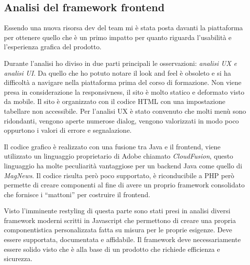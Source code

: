 \documentclass[a4paper]{article}
\begin{document}
\subsection{Analisi del framework frontend}
\par Essendo una nuova risorsa dev del team mi è stata posta davanti la piattaforma per
ottenere quello che è un primo impatto per quanto riguarda l'usabilità e l'esperienza
grafica del prodotto.
\par Durante l'analisi ho diviso in due parti principali le osservazioni: \emph{analisi UX e analisi UI}.
Da quello che ho potuto notare il look and feel è obsoleto e si ha difficoltà a navigare 
nella piattaforma prima del corso di formazione. Non viene presa in considerazione la responsivness,
il sito è molto statico e deformato visto da mobile. Il sito è organizzato con il codice
HTML con una impostazione tabellare non accessibile. Per l'analisi UX è stato convenuto 
che molti menù sono ridondanti, vengono aperte numerose dialog, vengono valorizzati in 
modo poco oppurtono i valori di errore e segnalazione.
\par Il codice grafico è realizzato con una fusione tra Java e il frontend, viene utilizzato
un linguaggio proprietario di Adobe chiamato \emph{CloudFusion}, questo linguaggio ha
molte peculiarità vantaggiose per un backend Java come quello di \emph{MagNews}.
Il codice risulta però poco supportato, è riconducibile a PHP però permette di creare
componenti al fine di avere un proprio framework consolidato che fornisce i ``mattoni''
per costruire il frontend.
\par Visto l'imminente restyling di questa parte sono stati presi in analisi diversi
framework moderni scritti in Javascript che permettono di creare una propria componentistica
personalizzata fatta su misura per le proprie esigenze. Deve essere supportata, 
documentata e affidabile. Il framework deve necessariamente essere solido visto che 
è alla base di un prodotto che richiede efficienza e sicurezza. \\
\end{document}
